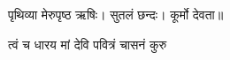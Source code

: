 \centerline{पृथिव्या  मेरुपृष्ठ  ऋषिः।  सुतलं  छन्दः।  कूर्मो  देवता॥}

{त्वं  च  धारय  मां  देवि  पवित्रं  चासनं  कुरु}
